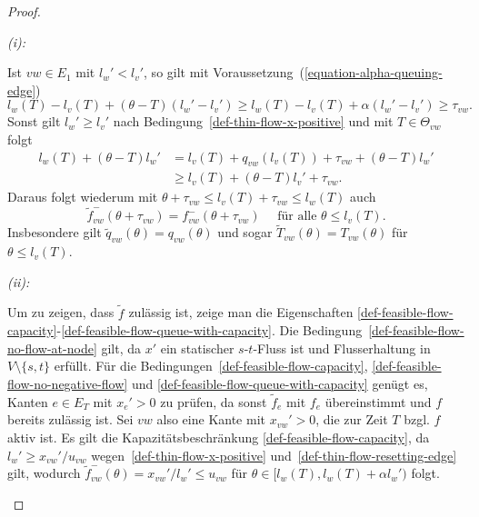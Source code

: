 \begin{proof}
	\begin{description}[leftmargin=0cm, topsep=0cm, itemindent=0.5cm]
		\item[Zu Aussage]\emph{(i):}
		
		Ist $vw\in E_1$ mit $l_w'<l_v'$, so gilt mit Voraussetzung~(\ref{equation-alpha-queuing-edge})
		\[
		l_w(T)-l_v(T) + (\theta - T)(l_w' - l_v') \geq l_w(T)-l_v(T)+\alpha(l_w'- l_v')\geq \tau_{vw}.
		\]
		Sonst gilt $l_w' \geq l_v'$ nach Bedingung~\ref{def-thin-flow-x-positive} und mit $T\in \Theta_{vw}$ folgt \begin{align*}
		l_w(T)+(\theta-T)l_w' &= l_v(T) + q_{vw}(l_v(T))+\tau_{vw}+(\theta - T)l_w'\\
		&\geq l_v(T) + (\theta-T)l_v'+\tau_{vw}.
		\end{align*}
		Daraus folgt wiederum mit $\theta + \tau_{vw} \leq l_v(T) + \tau_{vw} \leq l_w(T)$ auch \[ 
		\tilde{f}_{vw}^-(\theta + \tau_{vw}) = f_{vw}^-(\theta + \tau_{vw}) \text{~~~ für alle $\theta\leq l_v(T)$}.
		\]
		Insbesondere gilt $\tilde{q}_{vw}(\theta) = q_{vw}(\theta)$ und sogar $ \tilde{T}_{vw}(\theta)= T_{vw}(\theta)$ für $\theta \leq l_v(T)$.
		
		\item[Zu Aussage]\emph{(ii):}
		
		Um zu zeigen, dass $\tilde{f}$ zulässig ist, zeige man die Eigenschaften \ref{def-feasible-flow-capacity}-\ref{def-feasible-flow-queue-with-capacity}.
		Die Bedingung~\ref{def-feasible-flow-no-flow-at-node} gilt, da $x'$ ein statischer $s$-$t$-Fluss ist und Flusserhaltung in $V\setminus \{ s, t \}$ erfüllt.
		Für die Bedingungen~\ref{def-feasible-flow-capacity}, \ref{def-feasible-flow-no-negative-flow} und \ref{def-feasible-flow-queue-with-capacity} genügt es, Kanten $e\in E_T$ mit $x_e' > 0$ zu prüfen, da sonst $\tilde{f}_e$ mit $f_e$ übereinstimmt und $f$ bereits zulässig ist.
		Sei $vw$ also eine Kante mit $x_{vw}' > 0$, die zur Zeit $T$ bzgl. $f$ aktiv ist.
		Es gilt die Kapazitätsbeschränkung \ref{def-feasible-flow-capacity}, da $l_w'\geq x_{vw}' / u_{vw}$ wegen~\ref{def-thin-flow-x-positive} und~\ref{def-thin-flow-resetting-edge} gilt, wodurch $\tilde{f}^-_{vw}(\theta)=x_{vw}'/l_w'\leq u_{vw}$ für $\theta\in[l_w(T), l_w(T)+\alpha l_w')$ folgt.
		

\end{description}
\end{proof}
